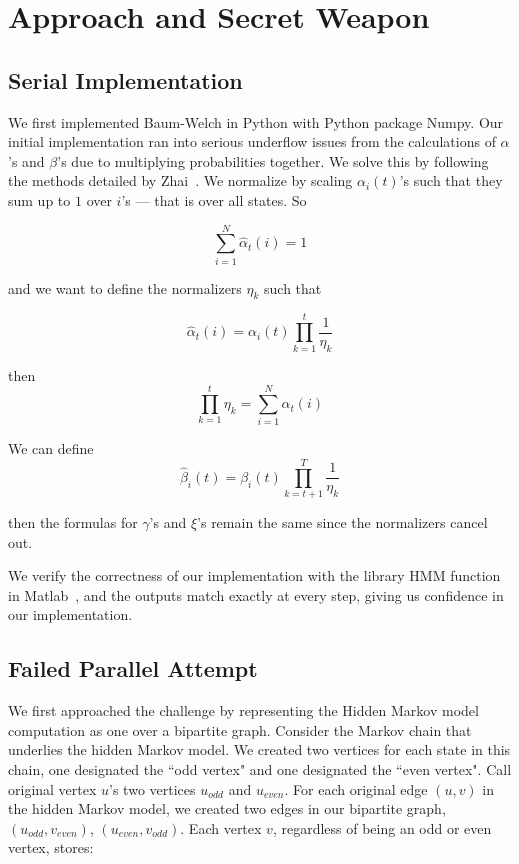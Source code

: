 \section{Approach and Secret Weapon}

\subsection{Serial Implementation}
We first implemented Baum-Welch in Python with Python package Numpy. Our initial
implementation ran into serious underflow issues from the calculations of
$\alpha$'s and $\beta$'s due to multiplying probabilities together. We solve
this by following the methods detailed by Zhai~\cite{normalizer}. We normalize by scaling $\alpha_i(t)$'s such that they sum up to $1$ over $i$'s --- that is over all states. So 

\begin{equation} 
\sum_{i=1}^N \hat{\alpha}_t(i) = 1
\end{equation}

and we want to define the normalizers $\eta_k$ such that

\begin{equation} 
    \hat{\alpha}_t(i) = \alpha_i(t) \prod_{k=1}^t \frac{1}{\eta_k}
\end{equation}

then 
\begin{equation}
\prod_{k=1}^t \eta_k =\sum_{i=1}^N \alpha_t(i)
\end{equation}

We can define 
\begin{equation} 
    \hat{\beta}_{i}(t) = \beta_{i}(t) \prod_{k=t+1}^T \frac{1}{\eta_k}
\end{equation}

then the formulas for $\gamma$'s and $\xi$'s remain the same since the normalizers cancel out.

We verify the correctness of our implementation with the library HMM function in
Matlab~\cite{matlab}, and the outputs match exactly at every step, giving us confidence in our implementation. 


\subsection{Failed Parallel Attempt}
We first approached the challenge by representing the Hidden Markov model computation as one over a bipartite graph.  Consider the Markov chain that underlies the hidden Markov model.  We created two vertices for each state in this chain, one designated the ``odd vertex" and one designated the ``even vertex".  Call original vertex $u$'s two vertices $u_{odd}$ and $u_{even}$. For each original edge $(u, v)$ in the hidden Markov model, we created two edges in our bipartite graph, $(u_{odd}, v_{even})$, $(u_{even}, v_{odd})$.   Each vertex $v$, regardless of being an odd or even vertex, stores: 

